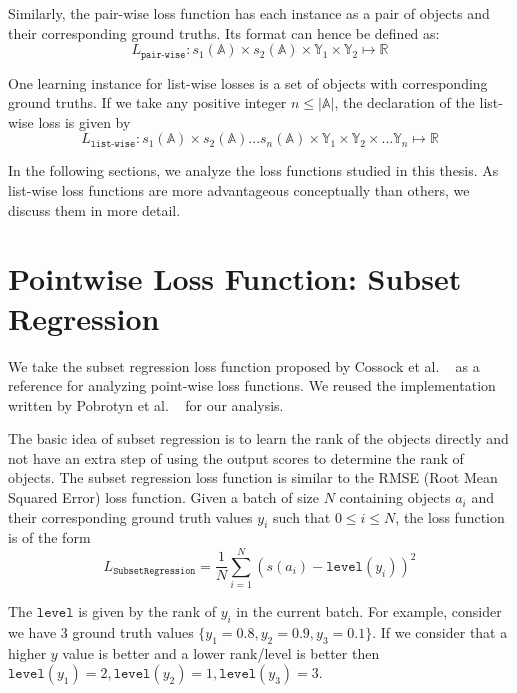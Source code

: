 \documentclass[12pt, twoside, ngerman]{report}
\begin{document}
Similarly,  the pair-wise loss function has each instance as a pair of objects and their corresponding ground truths. Its format can hence be defined as:
\begin{equation}
L_{\texttt{pair-wise}} : s_1(\mathbb{A}) \times s_2(\mathbb{A}) \times \mathbb{Y}_1 \times \mathbb{Y}_2 \mapsto \mathbb{R}
\end{equation}

One learning instance for list-wise losses is a set of objects with corresponding ground truths.
If we take any positive integer $n \leq |\mathbb{A}|$,  the declaration of the list-wise loss is given by
\begin{equation}
L_{\texttt{list-wise}} : s_1(\mathbb{A}) \times s_2(\mathbb{A}) ...  s_{n}(\mathbb{A}) \times \mathbb{Y}_1 \times \mathbb{Y}_2 \times ...  \mathbb{Y}_{n} \mapsto \mathbb{R}
\end{equation}

In the following sections, we analyze the loss functions studied in this thesis.
As list-wise loss functions are more advantageous conceptually than others, we discuss them in more detail.

\section{Pointwise Loss Function: Subset Regression}

We take the subset regression loss function proposed by Cossock et al. ~\cite{subsetregressionpaper} as a reference for analyzing point-wise loss functions.
We reused the implementation written by Pobrotyn et al. ~\cite{Pobrotyn2020ContextAwareLT} for our analysis.


The basic idea of subset regression is to learn the rank of the objects directly and not have an extra step of using the output scores to determine the rank of objects.
The subset regression loss function is similar to the RMSE (Root Mean Squared Error) loss function.
Given a batch of size $N$ containing objects $a_i$ and their corresponding ground truth values $y_i$ such that $0 \leq i \leq N$,  the loss function is of the form
\begin{equation}
L_{\texttt{SubsetRegression}} = \frac{1}{N} \sum\limits_{i=1}^{N} (s(a_i) - \texttt{level}(y_i))^2
\end{equation}

The $\texttt{level}$ is given by the rank of $y_i$ in the current batch.
For example,  consider we have 3 ground truth values $\{y_1 = 0.8, y_2 = 0.9, y_3 = 0.1\}$.
If we consider that a higher $y$ value is better and a lower rank/level is better then 
$\texttt{level}(y_1) = 2,  \texttt{level}(y_2) = 1,  \texttt{level}(y_3) = 3$.
\end{document}

